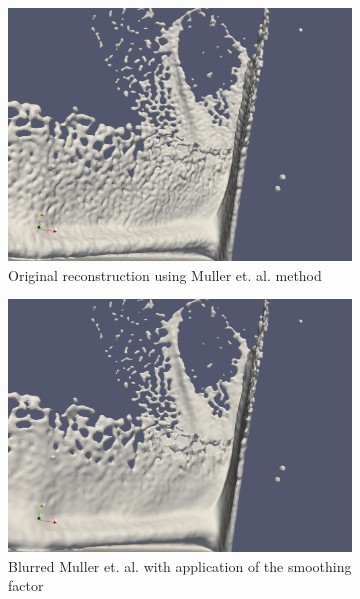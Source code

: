 \begin{figure}
	\begin{center}
		\begin{subfigure}[b]{0.7\textwidth}
			\includegraphics[width=\textwidth]{figures/BlurSmoothingFactorOriginal.png}
			\caption{Original reconstruction using Muller et. al. method}
		\end{subfigure}
		\begin{subfigure}[b]{0.7\textwidth}
			\includegraphics[width=\textwidth]{figures/BlurSmoothingFactor0.5.png}
			\caption{Blurred Muller et. al. with application of the smoothing factor}
		\end{subfigure}
		\begin{subfigure}[b]{0.7\textwidth}

\end{subfigure}
\end{center}
\end{figure}
